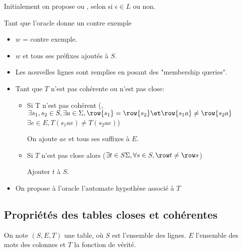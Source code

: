Initialement on propose
ou
, selon si $\epsilon \in L$ ou non.

Tant que l'oracle donne un contre exemple
\begin{itemize}
	\item $w$ = contre exemple.
	\item $w$ et tous ses préfixes ajoutés à $S$.
	\item Les nouvelles lignes sont remplies en posant des "membership queries".
	\item Tant que $T$ n'est pas cohérente ou n'est pas close:
	      \begin{itemize}
		      \item Si T n'est pas cohérent (\cad, $\exists s_1, s_2 \in S, \exists a \in \alphabet, \row{s_1} = \row{s_2} \et \row{s_1a} \neq \row{s_2a}$
		            \cad $\exists e \in E, T (s_1ae) \neq T(s_2ae)$)

		            On ajoute $ae$ et tous ses suffixes à $E$.
		      \item Si $T$ n'est pas close alors ($\exists t \in S \alphabet, \forall s \in S, \row t \neq \row s$)

		            Ajouter $t$ à $S$.
	      \end{itemize}
	\item On propose à l'oracle l'automate hypothèse associé à $T$
\end{itemize}

\subsection{Propriétés des tables closes et cohérentes}

\begin{notation}
	On note $(S,E,T)$ une table, où $S$ est l'ensemble des lignes. $E$ l'ensemble des mots des colonnes et $T$ la fonction de vérité.
\end{notation}

